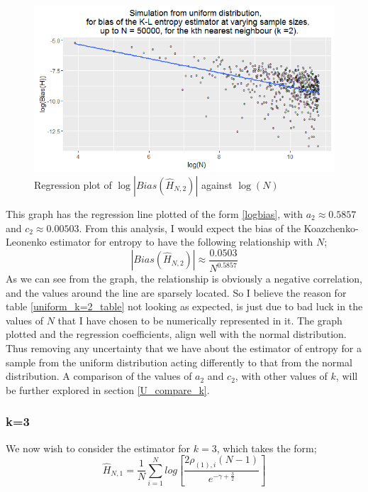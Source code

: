 \documentclass{article}
\begin{document}
\begin{figure}
  \begin{center}
    \includegraphics[width=\textwidth]{./Graphs/Uniform_k=2_plot.png}
  \end{center}
\caption{Regression plot of $\log|Bias(\hat{H}_{N, 2})|$ against $\log(N)$}
  \label{uniform_k=2_graph}
\end{figure}

This graph has the regression line plotted of the form \ref{logbias}, with $a_{2} \approx 0.5857$ and $c_{2} \approx 0.00503$. From this analysis, I would expect the bias of the Koazchenko-Leonenko estimator for entropy to have the following relationship with $N$;
\begin{equation}
|Bias(\hat{H}_{N, 2})| \approx \frac{0.0503}{N^{0.5857}}\nonumber
\end{equation}
As we can see from the graph, the relationship is obviously a negative correlation, and the values around the line are sparsely located. So I believe the reason for table \ref{uniform_k=2_table} not looking as expected, is just due to bad luck in the values of $N$ that I have chosen to be numerically represented in it. The graph plotted and the regression coefficients, align well with the normal distribution. Thus removing any uncertainty that we have about the estimator of entropy for a sample from the uniform distribution acting differently to that from the normal distribution. A comparison of the values of $a_{2}$ and $c_{2}$, with other values of $k$, will be further explored in section \ref{U_compare_k}.



\subsubsection{k=3} \label{U_k=3}
We now wish to consider the estimator for $k=3$, which takes the form;
\begin{equation} 
\hat{H}_{N, 1} = \frac{1}{N} \sum_{i=1}^{N} log \left[ \frac{2\rho_{(1),i} (N-1)}{e^{-\gamma + \frac{3}{2}}} \right] \nonumber
\end{equation}
\end{document}
